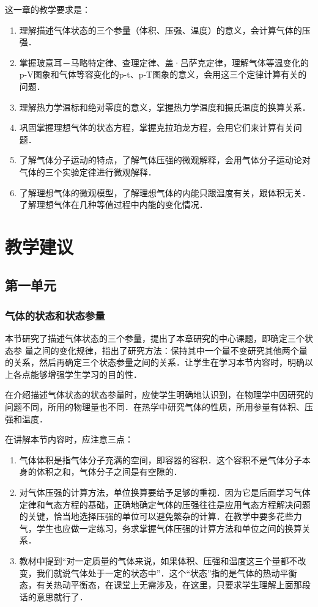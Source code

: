 这一章的教学要求是：
\begin{enumerate}
 \item 理解描述气体状态的三个参量（体积、压强、温度）的意义，会计算气体的压强．
  \item 掌握玻意耳－马略特定律、查理定律、盖·吕萨克定律，理解气体等温变化的p-V图象和气体等容变化的p-t、p-T图象的意义，会用这三个定律计算有关的问题．
  \item 理解热力学温标和绝对零度的意义，掌握热力学温度和摄氏温度的换算关系．
  \item 巩固掌握理想气体的状态方程，掌握克拉珀龙方程，会用它们来计算有关问题．
  \item 了解气体分子运动的特点，了解气体压强的微观解释，会用气体分子运动论对气体的三个实验定律进行微观解释．
  \item 了解理想气体的微观模型，了解理想气体的内能只跟温度有关，跟体积无关．了解理想气体在几种等值过程中内能的变化情况．
\end{enumerate}
 
\section{教学建议}
\subsection{第一单元}
\subsubsection{气体的状态和状态参量}

本节研究了描述气体状态的三个参量，提出了本章研究的中心课题，即确定三个状态参
量之间的变化规律，指出了研究方法：保持其中一个量不变研究其他两个量的关系，然后再确定三个状态参量之间的关系．让学生在学习本节内容时，明确以上各点能够增强学生学习的目的性．

在介绍描述气体状态的状态参量时，应使学生明确地认识到，在物理学中因研究的问题不同，所用的物理量也不同．在热学中研究气体的性质，所用参量有体积、压强和温度．

在讲解本节内容时，应注意三点：
\begin{enumerate}
\item 气体体积是指气体分子充满的空间，即容器的容积．这个容积不是气体分子本身的体积之和，气体分子之间是有空隙的．
\item 对气体压强的计算方法，单位换算要给予足够的重视．因为它是后面学习气体定律和气态方程的基础，正确地确定气体的压强往往是应用气态方程解决问题的关键，恰当地选择压强的单位可以避免繁杂的计算．在教学中要多花些力气，学生也应做一定练习，务求掌握气体压强的计算方法和单位之间的换算关系．
\item 教材中提到“对一定质量的气体来说，如果体积、压强和温度这三个量都不改变，我们就说气体处于一定的状态中”．这个“状态”指的是气体的热动平衡态，有关热动平衡态，在课堂上无需涉及，在这里，只要求学生理解上面那段话的意思就行了．
\end{enumerate}

